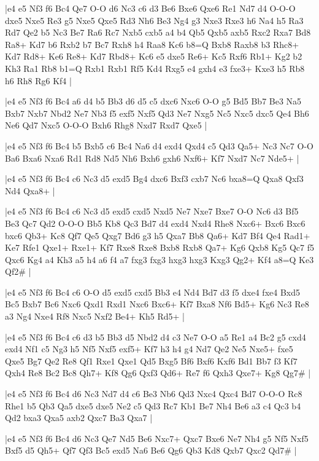 \whitename{}
\blackname{}
\makegametitle
|e4 e5 Nf3 f6 Bc4 Qe7 O-O d6 Nc3 c6 d3 Be6 Bxe6 Qxe6 Re1 Nd7 d4 O-O-O dxe5 Nxe5 Re3 g5 Nxe5 Qxe5 Rd3 Nh6 Be3 Ng4 g3 Nxe3 Rxe3 h6 Na4 h5 Ra3 Rd7 Qe2 b5 Nc3 Be7 Ra6 Rc7 Nxb5 cxb5 a4 b4 Qb5 Qxb5 axb5 Rxc2 Rxa7 Bd8 Ra8+ Kd7 b6 Rxb2 b7 Bc7 Rxh8 h4 Raa8 Kc6 b8=Q Bxb8 Raxb8 b3 Rhc8+ Kd7 Rd8+ Ke6 Re8+ Kd7 Rbd8+ Kc6 e5 dxe5 Re6+ Kc5 Rxf6 Rb1+ Kg2 b2 Kh3 Ra1 Rb8 b1=Q Rxb1 Rxb1 Rf5 Kd4 Rxg5 e4 gxh4 e3 fxe3+ Kxe3 h5 Rb8 h6 Rh8 Rg6 Kf4  |

\whitename{}
\blackname{}
\makegametitle
|e4 e5 Nf3 f6 Bc4 a6 d4 b5 Bb3 d6 d5 c5 dxc6 Nxc6 O-O g5 Bd5 Bb7 Be3 Na5 Bxb7 Nxb7 Nbd2 Ne7 Nb3 f5 exf5 Nxf5 Qd3 Ne7 Nxg5 Nc5 Nxc5 dxc5 Qe4 Bh6 Ne6 Qd7 Nxc5 O-O-O Bxh6 Rhg8 Nxd7 Rxd7 Qxe5  |

\whitename{}
\blackname{}
\makegametitle
|e4 e5 Nf3 f6 Bc4 b5 Bxb5 c6 Bc4 Na6 d4 exd4 Qxd4 c5 Qd3 Qa5+ Nc3 Nc7 O-O Ba6 Bxa6 Nxa6 Rd1 Rd8 Nd5 Nh6 Bxh6 gxh6 Nxf6+ Kf7 Nxd7 Nc7 Nde5+  |

\whitename{}
\blackname{}
\makegametitle
|e4 e5 Nf3 f6 Bc4 c6 Nc3 d5 exd5 Bg4 dxc6 Bxf3 cxb7 Nc6 bxa8=Q Qxa8 Qxf3 Nd4 Qxa8+  |

\whitename{}
\blackname{}
\makegametitle
|e4 e5 Nf3 f6 Bc4 c6 Nc3 d5 exd5 cxd5 Nxd5 Ne7 Nxe7 Bxe7 O-O Nc6 d3 Bf5 Be3 Qc7 Qd2 O-O-O Bb5 Kb8 Qc3 Bd7 d4 exd4 Nxd4 Rhe8 Nxc6+ Bxc6 Bxc6 bxc6 Qb3+ Kc8 Qf7 Qe5 Qxg7 Bd6 g3 h5 Qxa7 Bb8 Qa6+ Kd7 Bf4 Qe4 Rad1+ Ke7 Rfe1 Qxe1+ Rxe1+ Kf7 Rxe8 Rxe8 Bxb8 Rxb8 Qa7+ Kg6 Qxb8 Kg5 Qc7 f5 Qxc6 Kg4 a4 Kh3 a5 h4 a6 f4 a7 fxg3 fxg3 hxg3 hxg3 Kxg3 Qg2+ Kf4 a8=Q Ke3 Qf2\#  |

\whitename{}
\blackname{}
\makegametitle
|e4 e5 Nf3 f6 Bc4 c6 O-O d5 exd5 cxd5 Bb3 e4 Nd4 Bd7 d3 f5 dxe4 fxe4 Bxd5 Bc5 Bxb7 Bc6 Nxc6 Qxd1 Rxd1 Nxc6 Bxc6+ Kf7 Bxa8 Nf6 Bd5+ Kg6 Nc3 Re8 a3 Ng4 Nxe4 Rf8 Nxc5 Nxf2 Be4+ Kh5 Rd5+  |

\whitename{}
\blackname{}
\makegametitle
|e4 e5 Nf3 f6 Bc4 c6 d3 b5 Bb3 d5 Nbd2 d4 c3 Ne7 O-O a5 Re1 a4 Bc2 g5 cxd4 exd4 Nf1 c5 Ng3 h5 Nf5 Nxf5 exf5+ Kf7 h3 h4 g4 Nd7 Qe2 Ne5 Nxe5+ fxe5 Qxe5 Bg7 Qe2 Re8 Qf1 Rxe1 Qxe1 Qd5 Bxg5 Bf6 Bxf6 Kxf6 Bd1 Bb7 f3 Kf7 Qxh4 Re8 Bc2 Bc8 Qh7+ Kf8 Qg6 Qxf3 Qd6+ Re7 f6 Qxh3 Qxe7+ Kg8 Qg7\#  |

\whitename{}
\blackname{}
\makegametitle
|e4 e5 Nf3 f6 Bc4 d6 Nc3 Nd7 d4 c6 Be3 Nb6 Qd3 Nxc4 Qxc4 Bd7 O-O-O Rc8 Rhe1 b5 Qb3 Qa5 dxe5 dxe5 Ne2 c5 Qd3 Rc7 Kb1 Be7 Nh4 Be6 a3 c4 Qc3 b4 Qd2 bxa3 Qxa5 axb2 Qxc7 Ba3 Qxa7  |

\whitename{}
\blackname{}
\makegametitle
|e4 e5 Nf3 f6 Bc4 d6 Nc3 Qe7 Nd5 Be6 Nxc7+ Qxc7 Bxe6 Ne7 Nh4 g5 Nf5 Nxf5 Bxf5 d5 Qh5+ Qf7 Qf3 Bc5 exd5 Na6 Be6 Qg6 Qb3 Kd8 Qxb7 Qxc2 Qd7\#  |

